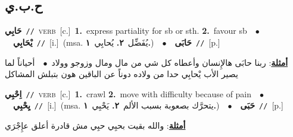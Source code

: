 \documentclass[10pt,a4paper,twoside]{article} %
\begin{document}
\begin{multicols}{2}
{{{{{{{{\vspace{-3mm}
\subsection*{\color{blue}\foreignlanguage{arabic}{ح.ب.ي}\color{blue}{}} 

{\setlength\topsep{0pt}\textbf{\foreignlanguage{arabic}{حَابِي}}\ {\color{gray}\texttt{//}\color{black}}\ \textsc{verb}\ [c.]\ \textbf{1.}~express partiality for sb or sth.  \textbf{2.}~favour sb\ \ $\bullet$\ \ \setlength\topsep{0pt}\textbf{\foreignlanguage{arabic}{يْحَابِي}}\ {\color{gray}\texttt{//}\color{black}}\ [i.]\ \color{gray}(msa. \foreignlanguage{arabic}{يُفَضِّل}~\foreignlanguage{arabic}{\textbf{٢.}}  \foreignlanguage{arabic}{يُحابِي}~\foreignlanguage{arabic}{\textbf{١.}})\color{black}\ \ $\bullet$\ \ \setlength\topsep{0pt}\textbf{\foreignlanguage{arabic}{حَابَى}}\ {\color{gray}\texttt{//}\color{black}}\ [p.]\  \begin{flushright}\color{gray}\foreignlanguage{arabic}{\textbf{\underline{\foreignlanguage{arabic}{أمثلة}}}: ربنا حابَى هالإِنسان وأعطاه كل شي من مال ومال وزوجو وولاد\ $\bullet$\ \  أحياناً لما يصير الأب يْحابِي حدا من ولاده دوناً عن الباقين هون بتبلش المشاكل}\end{flushright}\color{black}} \vspace{2mm}

{\setlength\topsep{0pt}\textbf{\foreignlanguage{arabic}{اِحْبِي}}\ {\color{gray}\texttt{//}\color{black}}\ \textsc{verb}\ [c.]\ \textbf{1.}~crawl  \textbf{2.}~move with difficulty because of pain\ \ $\bullet$\ \ \setlength\topsep{0pt}\textbf{\foreignlanguage{arabic}{يِحْبِي}}\ {\color{gray}\texttt{//}\color{black}}\ [i.]\ \color{gray}(msa. \foreignlanguage{arabic}{يتحرَّك بصعوبة بسبب الألم}~\foreignlanguage{arabic}{\textbf{٢.}}  \foreignlanguage{arabic}{يَحْبِي}~\foreignlanguage{arabic}{\textbf{١.}})\color{black}\ \ $\bullet$\ \ \setlength\topsep{0pt}\textbf{\foreignlanguage{arabic}{حَبَى}}\ {\color{gray}\texttt{//}\color{black}}\ [p.]\  \begin{flushright}\color{gray}\foreignlanguage{arabic}{\textbf{\underline{\foreignlanguage{arabic}{أمثلة}}}: والله بقيت بحبِي حبِي مش قادرة أعلق عإِجْرَي}\end{flushright}\color{black}} \vspace{2mm}

}}}}}}}}
\end{multicols}
\end{document}
